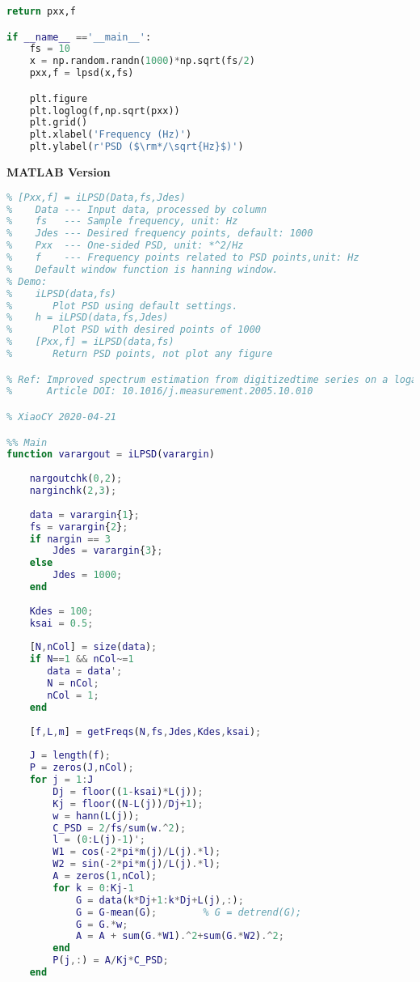 \begin{lstlisting}[language=Python]
    return pxx,f

if __name__ =='__main__':
    fs = 10
    x = np.random.randn(1000)*np.sqrt(fs/2)
    pxx,f = lpsd(x,fs)

    plt.figure
    plt.loglog(f,np.sqrt(pxx))
    plt.grid()
    plt.xlabel('Frequency (Hz)')
    plt.ylabel(r'PSD ($\rm*/\sqrt{Hz}$)')
\end{lstlisting}


{\noindent \bfseries MATLAB Version}


\begin{lstlisting}[language=Matlab]
% Use LPSD mothod to plot power spectral density
% [Pxx,f] = iLPSD(Data,fs,Jdes)
%    Data --- Input data, processed by column
%    fs   --- Sample frequency, unit: Hz
%    Jdes --- Desired frequency points, default: 1000
%    Pxx  --- One-sided PSD, unit: *^2/Hz
%    f    --- Frequency points related to PSD points,unit: Hz
%    Default window function is hanning window.
% Demo:
%    iLPSD(data,fs)
%       Plot PSD using default settings.
%    h = iLPSD(data,fs,Jdes)
%       Plot PSD with desired points of 1000
%    [Pxx,f] = iLPSD(data,fs)
%       Return PSD points, not plot any figure

% Ref: Improved spectrum estimation from digitizedtime series on a logarithmic frequency axis
%      Article DOI: 10.1016/j.measurement.2005.10.010

% XiaoCY 2020-04-21

%% Main
function varargout = iLPSD(varargin)
    
    nargoutchk(0,2);
    narginchk(2,3);
    
    data = varargin{1};
    fs = varargin{2};
    if nargin == 3
        Jdes = varargin{3};
    else
        Jdes = 1000;
    end
    
    Kdes = 100;
    ksai = 0.5;
    
    [N,nCol] = size(data);
    if N==1 && nCol~=1
       data = data';
       N = nCol;
       nCol = 1;
    end
    
    [f,L,m] = getFreqs(N,fs,Jdes,Kdes,ksai);
    
    J = length(f);
    P = zeros(J,nCol);
    for j = 1:J
        Dj = floor((1-ksai)*L(j));
        Kj = floor((N-L(j))/Dj+1);
        w = hann(L(j));
        C_PSD = 2/fs/sum(w.^2);
        l = (0:L(j)-1)';
        W1 = cos(-2*pi*m(j)/L(j).*l);
        W2 = sin(-2*pi*m(j)/L(j).*l);
        A = zeros(1,nCol);
        for k = 0:Kj-1
            G = data(k*Dj+1:k*Dj+L(j),:);
            G = G-mean(G);        % G = detrend(G);   
            G = G.*w;
            A = A + sum(G.*W1).^2+sum(G.*W2).^2;
        end
        P(j,:) = A/Kj*C_PSD;
    end
    

\end{lstlisting}
